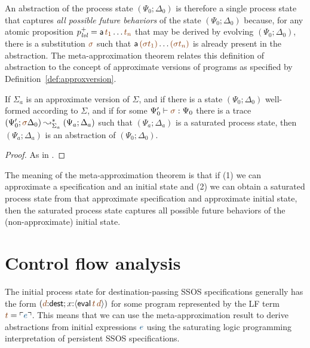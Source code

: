 An abstraction of the process state $(\Psi_0; \Delta_0)$ is therefore
a single process state that captures {\it all possible future
  behaviors} of the state $(\Psi_0; \Delta_0)$ because, for any atomic
proposition $p^+_\mlvl = {\sf a}\,\lf{t_1}\ldots \lf{t_n}$ that may be derived
by evolving $(\Psi_0; \Delta_0)$, there is a substitution $\lf\sigma$
such that ${\sf a}\,\lf{(\sigma t_1)}\ldots\lf{(\sigma t_n)}$ is already present
in the abstraction. The meta-approximation theorem relates this definition
of abstraction to the concept of approximate versions of programs as
specified by Definition~\ref{def:approxversion}.  

\bigskip
\begin{theorem}\label{thm:metapprox}
  If $\Sigma_a$ is an approximate version of $\Sigma$, and if there is a
  state $(\Psi_0; \Delta_0)$ well-formed according to $\Sigma$, and if
  for some $\Psi_0' \vdash \lf\sigma : \Psi_0$ there is a trace
  $(\Psi_0'; \lf\sigma\Delta_0) \leadsto^*_{\Sigma_a} (\Psi_a; \Delta_a)$
  such that $(\Psi_a; \Delta_a)$ is a saturated process state, then
  $(\Psi_a; \Delta_a)$ is an abstraction of $(\Psi_0; \Delta_0)$.
\end{theorem}

\begin{proof}
As in \cite[Theorem 3]{simmons11logical}.
\end{proof}

The meaning of the meta-approximation theorem is that if (1) we can
approximate a specification and an initial state and (2) we can obtain
a saturated process state from that approximate specification
and approximate initial state, then the saturated process state captures
all possible future behaviors of the (non-approximate) initial state. 






\section{Control flow analysis}
\label{sec:0cfa}

The initial process state for destination-passing SSOS specifications
generally has the form 
$(\lf{d}{:}{\sf dest}; x{:}\susp{{\sf eval}\,\lf{t}\,\lf{d}})$
for some program represented by the LF term $\lf{t} = \interp{e}$. 
This means that we
can use the meta-approximation result to derive abstractions from
initial expressions $\obj{e}$ using the saturating logic programming
interpretation of persistent SSOS specifications.

